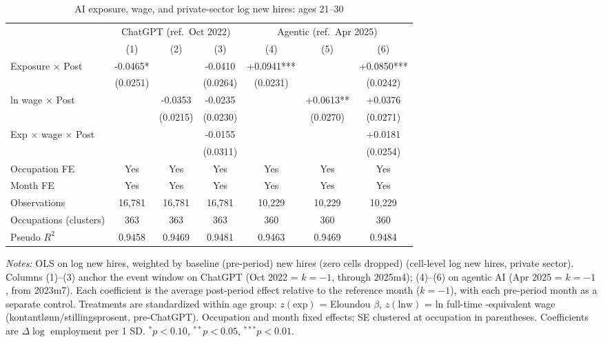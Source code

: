 \begin{table}[htbp]\centering
\caption{AI exposure, wage, and private-sector log new hires: ages 21–30}
\label{tab:ca_did_age1}
\small
\begin{tabular}{lcccccc}
\toprule
 & \multicolumn{3}{c}{ChatGPT (ref.\ Oct 2022)} & \multicolumn{3}{c}{Agentic (ref.\ Apr 2025)} \\
\cmidrule(lr){2-4} \cmidrule(lr){5-7}
 & (1) & (2) & (3) & (4) & (5) & (6) \\
\midrule
Exposure $\times$ Post & -0.0465* &  & -0.0410 & +0.0941*** &  & +0.0850*** \\
 & (0.0251) &  & (0.0264) & (0.0231) &  & (0.0242) \\
ln wage $\times$ Post &  & -0.0353 & -0.0235 &  & +0.0613** & +0.0376 \\
 &  & (0.0215) & (0.0230) &  & (0.0270) & (0.0271) \\
Exp $\times$ wage $\times$ Post &  &  & -0.0155 &  &  & +0.0181 \\
 &  &  & (0.0311) &  &  & (0.0254) \\
\midrule
Occupation FE & Yes & Yes & Yes & Yes & Yes & Yes \\
Month FE & Yes & Yes & Yes & Yes & Yes & Yes \\
Observations & 16,781 & 16,781 & 16,781 & 10,229 & 10,229 & 10,229 \\
Occupations (clusters) & 363 & 363 & 363 & 360 & 360 & 360 \\
Pseudo $R^2$ & 0.9458 & 0.9469 & 0.9481 & 0.9463 & 0.9469 & 0.9484 \\
\bottomrule
\end{tabular}
\begin{minipage}{\linewidth}\vspace{2pt}\footnotesize
\emph{Notes:} OLS on log new hires, weighted by baseline (pre-period) new hires (zero cells dropped) (cell-level log new hires, private sector). Columns (1)--(3) anchor the event window on ChatGPT (Oct 2022 = $k{=}{-}1$, through 2025m4); (4)--(6) on agentic AI (Apr 2025 = $k{=}{-}1$, from 2023m7). Each coefficient is the average post-period effect relative to the reference month ($k{=}{-}1$), with each pre-period month as a separate control. Treatments are standardized within age group: $z(\text{exp})$ = Eloundou $\beta$, $z(\text{lnw})$ = ln full-time -equivalent wage (kontantl\o nn$/$stillingsprosent, pre-ChatGPT). Occupation and month fixed effects; SE clustered at occupation in parentheses. Coefficients are $\Delta\log$ employment per 1 SD. $^{*}p<0.10$, $^{**}p<0.05$, $^{***}p<0.01$.
\end{minipage}
\end{table}